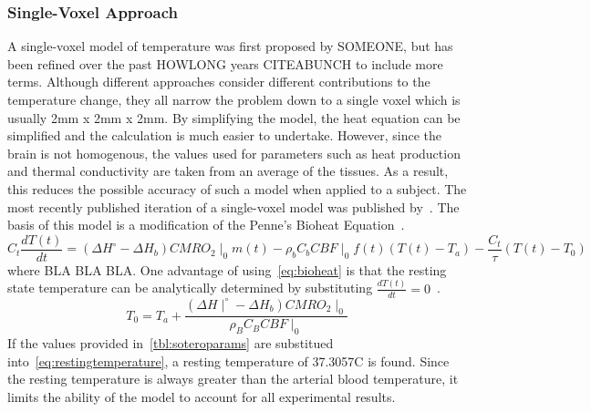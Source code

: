     \subsubsection{\label{sss:singlevoxel}Single-Voxel Approach}
    A single-voxel model of temperature was first proposed by SOMEONE, but has been refined over the past HOWLONG years CITEABUNCH to include more terms.  Although different approaches consider different contributions to the temperature change, they all narrow the problem down to a single voxel which is usually 2mm x 2mm x 2mm.  By simplifying the model, the heat equation can be simplified and the calculation is much easier to undertake.  However, since the brain is not homogenous, the values used for parameters such as heat production and thermal conductivity are taken from an average of the tissues.  As a result, this reduces the possible accuracy of such a model when applied to a subject.
    The most recently published iteration of a single-voxel model was published by~\citet{sotero2011}.  The basis of this model is a modification of the Penne's Bioheat Equation~\citep{pennes, sotero2011}.
    \begin{equation}
      \label{eq:bioheat}
      C_t \frac{dT(t)}{dt} = (\Delta H^{\circ}-\Delta H_{b}) CMRO_{2}\mid_{0} m(t) - \rho_{b} C_{b} CBF\mid_{0} f(t) (T(t) - T_{a}) - \frac{C_{t}}{\tau} (T(t)-T_{0})
    \end{equation}
    where BLA BLA BLA.  
    One advantage of using~\cref{eq:bioheat} is that the resting state temperature can be analytically determined by substituting $\frac{dT(t)}{dt} = 0$~\citep{sotero2011}.
    \begin{equation}
      \label{eq:restingtemperature}
      T_{0} = T_{a} + \frac{(\Delta H \mid^{\circ} - \Delta H_{b}) CMRO_{2}\mid_{0}}{\rho_{B} C_{B} CBF\mid_{0}}
    \end{equation}
    If the values provided in~\cref{tbl:soteroparams} are substitued into~\cref{eq:restingtemperature}, a resting temperature of 37.3057\degree C is found.  Since the resting temperature is always greater than the arterial blood temperature, it limits the ability of the model to account for all experimental results. 
    
